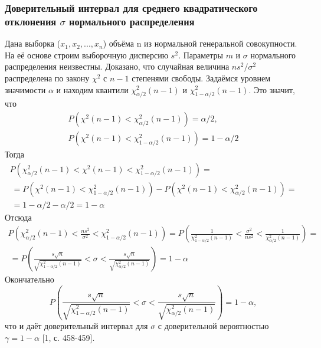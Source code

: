\documentclass[a4paper]{article}
\begin{document}
    \subsubsection{Доверительный интервал для среднего квадратического отклонения $\sigma$ нормального распределения}
    Дана выборка ($x_{1},x_{2}, ... ,x_{n}$) объёма n из нормальной генеральной совокупности. На её основе строим выборочную дисперсию $s^{2}$. Параметры $m$ и $\sigma$ нормального распределения неизвестны. Доказано, что случайная величина $ns^{2}/\sigma^{2}$ распределена по закону $\chi^{2}$ с $n-1$ степенями свободы.
    \newline
    Задаёмся уровнем значимости $\alpha$ и находим квантили $\chi^{2}_{\alpha/2}(n-1)$ и $\chi^{2}_{1-\alpha/2}(n-1)$.
    \newline
    Это значит, что 
    \begin{equation}
        \begin{split}
        P\left(\chi^{2}(n-1) < \chi^{2}_{\alpha/2}(n-1)\right) = \alpha/2, \\
        P\left(\chi^{2}(n-1) < \chi^{2}_{1-\alpha/2}(n-1)\right) = 1-\alpha/2
        \end{split}
        \label{P_chi_2x2}        
    \end{equation}
    Тогда
    \begin{multline}
         P\left(\chi^{2}_{\alpha/2}(n-1) < \chi^{2}(n-1) < \chi^{2}_{1-\alpha/2}(n-1)\right) = \\\ =
          P\left(\chi^{2}(n-1) < \chi^{2}_{1-\alpha/2}(n-1)\right) -P\left(\chi^{2}(n-1) < \chi^{2}_{\alpha/2}(n-1)\right) = \\\ = 1 - \alpha/2 -\alpha/2 = 1 - \alpha
          \label{P_chi_2}
    \end{multline}
    Отсюда
    \begin{multline}
         P\left(\chi^{2}_{\alpha/2}(n-1) < \frac{ns^{2}}{\sigma^{2}} < \chi^{2}_{1-\alpha/2}(n-1)\right) =
          P\left(\frac{1}{\chi^{2}_{1-\alpha/2}(n-1)} < \frac{\sigma^{2}}{ns^{2}} < \frac{1}{\chi^{2}_{\alpha/2}(n-1)} \right) = \\\ =
          P\left(\frac{s\sqrt{n}}{\sqrt{\chi^{2}_{1-\alpha/2}(n-1)}} < \sigma <  \frac{s\sqrt{n}}{\sqrt{\chi^{2}_{\alpha/2}(n-1)}}\right) = 1- \alpha
          \label{interv}
    \end{multline}
    Окончательно
    \begin{equation}
         P\left(\frac{s\sqrt{n}}{\sqrt{\chi^{2}_{1-\alpha/2}(n-1)}} < \sigma <  \frac{s\sqrt{n}}{\sqrt{\chi^{2}_{\alpha/2}(n-1)}}\right) = 1- \alpha,
         \label{fin_interval}
    \end{equation}
    что и даёт доверительный интервал для $\sigma$ с доверительной вероятностью $\gamma = 1 - \alpha$ [1, с. 458-459].
    
\end{document}
